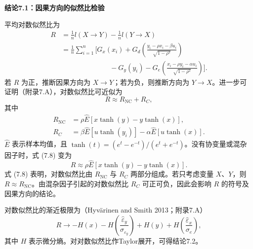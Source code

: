 \par\medskip{}\noindent\textbf{结论7.1：因果方向的似然比检验}\par
平均对数似然比为
\begin{equation}
\begin{aligned}
R&=\frac1nl(X\to Y)-\frac1nl(Y\to X)\\
&=\frac1n\sum_{i=1}^n\Biggl[G_x(x_i)
+G_d\left(\frac{y_i-\rho x_i-\beta u_i}{\sqrt{1-\rho^2}}\right)\\
&\hspace{7em}-G_y(y_i)-G_e\left(\frac{x_i-\rho y_i-\alpha u_i}{\sqrt{1-\rho^2}}\right)\Biggr].
\end{aligned}
\tag{7.7}
\end{equation}
若 $R$ 为正，推断因果方向为 $X\to Y$；若为负，则推断方向为 $Y\to X$。进一步可证明（附录7.A），对数似然比可近似为
\begin{equation}
R\approx R_{\mathrm{NC}}+R_C,
\tag{7.8}
\end{equation}
其中
\[
\begin{aligned}
R_{\mathrm{NC}}&=\rho\widehat E[x\tanh(y)-y\tanh(x)],\\
R_C&=\beta\widehat E[u\tanh(y_i)]-\alpha\widehat E[u\tanh(x)].
\end{aligned}
\]
$\widehat E$ 表示样本均值，且 $\tanh(t)=(e^t-e^{-t})/(e^t+e^{-t})$。没有协变量或混杂因子时，式 (7.8) 变为
\begin{equation}
R\approx\rho\widehat E[x\tanh(y)-y\tanh(x)].
\tag{7.9}
\end{equation}
式 (7.8) 表明，对数似然比由 $R_{\mathrm{NC}}$ 与 $R_C$ 两部分组成。若只考虑变量 $X$、$Y$，则 $R\approx R_{\mathrm{NC}}$。由混杂因子引起的对数似然比 $R_C$ 可正可负，因此会影响 $R$ 的符号及因果方向的结论。

对数似然比的渐近极限为（Hyvärinen and Smith 2013；附录7.A）
\begin{equation}
R\to-H(x)-H\left(\frac{\widehat\varepsilon_y}{\sigma_{\varepsilon_y}}\right)
+H(y)+H\left(\frac{\widehat\varepsilon_x}{\sigma_e}\right),
\tag{7.10}
\end{equation}
其中 $H$ 表示微分熵。对对数似然比作Taylor展开，可得结论7.2。

